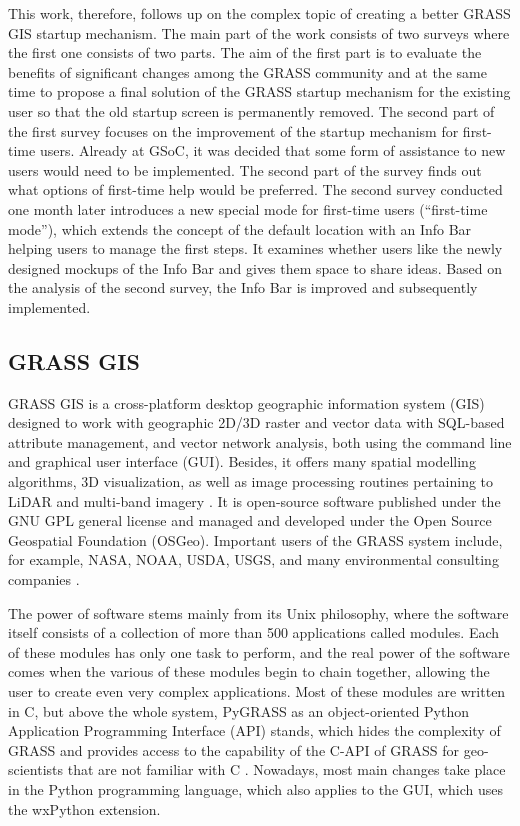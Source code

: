 \documentclass[a4paper,10pt,twoside]{article}
\begin{document}
This work, therefore, follows up on the complex topic of creating a better GRASS GIS startup mechanism. The main part of the work consists of two surveys where the first one consists of two parts. The aim of the first part is to evaluate the benefits of significant changes among the GRASS community and at the same time to propose a final solution of the GRASS startup mechanism for the existing user so that the old startup screen is permanently removed. The second part of the first survey focuses on the improvement of the startup mechanism for first-time users. Already at GSoC, it was decided that some form of assistance to new users would need to be implemented. The second part of the survey finds out what options of first-time help would be preferred. The second survey conducted one month later introduces a new special mode for first-time users (``first-time mode''), which extends the concept of the default location with an Info Bar helping users to manage the first steps. It examines whether users like the newly designed mockups of the Info Bar and gives them space to share ideas. Based on the analysis of the second survey, the Info Bar is improved and subsequently implemented.

\newpage
\vspace*{-1cm}
\pagestyle{fancy}
\subsection{GRASS GIS}
\noindent GRASS GIS is a cross-platform desktop geographic information system (GIS) designed to work with geographic 2D/3D raster and vector data with SQL-based attribute management, and vector network analysis, both using the command line and graphical user interface (GUI). Besides, it offers many spatial modelling algorithms, 3D visualization, as well as image processing routines pertaining to LiDAR and multi-band imagery \cite{NETELER2012124}. It is open-source software published under the GNU GPL general license and managed and developed under the Open Source Geospatial Foundation (OSGeo). Important users of the GRASS system include, for example, NASA, NOAA, USDA, USGS, and many environmental consulting companies \cite{grassgis}. 

The power of software stems mainly from its Unix philosophy, where the software itself consists of a collection of more than 500 applications called modules. Each of these modules has only one task to perform, and the real power of the software comes when the various of these modules begin to chain together, allowing the user to create even very complex applications. Most of these modules are written in C, but above the whole system, PyGRASS as an object-oriented Python Application Programming Interface (API) stands, which hides the complexity of GRASS and provides access to the capability of the C-API of GRASS for geo-scientists that are not familiar with C \cite{pygrass}. Nowadays, most main changes take place in the Python programming language, which also applies to the GUI, which uses the wxPython extension. 
\end{document}
